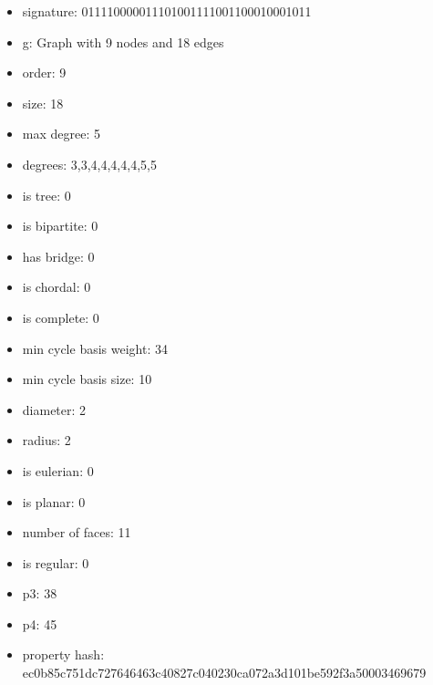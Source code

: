 \newpage
\begin{figure}
\end{figure}
\begin{itemize}
\item signature: 011110000011101001111001100010001011
\item g: Graph with 9 nodes and 18 edges
\item order: 9
\item size: 18
\item max degree: 5
\item degrees: 3,3,4,4,4,4,4,5,5
\item is tree: 0
\item is bipartite: 0
\item has bridge: 0
\item is chordal: 0
\item is complete: 0
\item min cycle basis weight: 34
\item min cycle basis size: 10
\item diameter: 2
\item radius: 2
\item is eulerian: 0
\item is planar: 0
\item number of faces: 11
\item is regular: 0
\item p3: 38
\item p4: 45
\item property hash: ec0b85c751dc727646463c40827c040230ca072a3d101be592f3a50003469679
\end{itemize}
